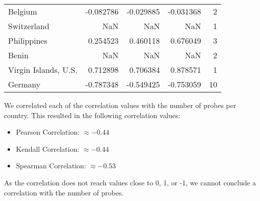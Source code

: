 \begin{table}[ht]
\begin{tabular}{lrrrr}
		Belgium                     & -0.082786   & -0.029885   & -0.031368   & 2  \\
		Switzerland                 & NaN         & NaN         & NaN         & 1  \\
		Philippines                 & 0.254523    & 0.460118    & 0.676049    & 3  \\
		Benin                       & NaN         & NaN         & NaN         & 2  \\
		Virgin Islands, U.S.        & 0.712898    & 0.706384    & 0.878571    & 1  \\
		Germany                     & -0.787348   & -0.549425   & -0.753059   & 10 \\
		\bottomrule
	\end{tabular}
\end{table}

We correlated each of the correlation values with the number of probes per country. This resulted in the following correlation values:

\begin{itemize}
	\item Pearson Correlation: $\approx -0.44$
	\item Kendall Correlation: $\approx -0.44$
	\item Spearman Correlation: $\approx -0.53$
\end{itemize}

As the correlation does not reach values close to 0, 1, or -1, we cannot conclude a correlation with the number of probes.


